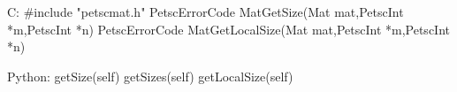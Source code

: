 C:
#include "petscmat.h"
PetscErrorCode MatGetSize(Mat mat,PetscInt *m,PetscInt *n)
PetscErrorCode MatGetLocalSize(Mat mat,PetscInt *m,PetscInt *n)

Python:
getSize(self)
getSizes(self)
getLocalSize(self)
